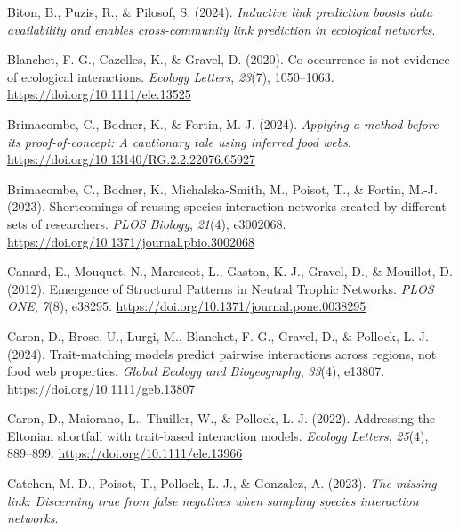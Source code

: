 \documentclass[
]{article}
\newlength{\cslhangindent}
\newenvironment{CSLReferences}[2] %
 {\begin{list}{}{%
  \setlength{\itemindent}{0pt}
  \setlength{\leftmargin}{0pt}
  \setlength{\parsep}{0pt}
  \ifodd #1
   \setlength{\leftmargin}{\cslhangindent}
   \setlength{\itemindent}{-1\cslhangindent}
  \fi
  \setlength{\itemsep}{#2\baselineskip}}}
 {\end{list}}
\begin{document}
\begin{CSLReferences}{1}{0}
Biton, B., Puzis, R., \& Pilosof, S. (2024). \emph{Inductive link
prediction boosts data availability and enables cross-community link
prediction in ecological networks}.

Blanchet, F. G., Cazelles, K., \& Gravel, D. (2020). Co-occurrence is
not evidence of ecological interactions. \emph{Ecology Letters},
\emph{23}(7), 1050--1063. \url{https://doi.org/10.1111/ele.13525}

Brimacombe, C., Bodner, K., \& Fortin, M.-J. (2024). \emph{Applying a
method before its proof-of-concept: {A} cautionary tale using inferred
food webs}. \url{https://doi.org/10.13140/RG.2.2.22076.65927}

Brimacombe, C., Bodner, K., Michalska-Smith, M., Poisot, T., \& Fortin,
M.-J. (2023). Shortcomings of reusing species interaction networks
created by different sets of researchers. \emph{PLOS Biology},
\emph{21}(4), e3002068.
\url{https://doi.org/10.1371/journal.pbio.3002068}

Canard, E., Mouquet, N., Marescot, L., Gaston, K. J., Gravel, D., \&
Mouillot, D. (2012). Emergence of {Structural Patterns} in {Neutral
Trophic Networks}. \emph{PLOS ONE}, \emph{7}(8), e38295.
\url{https://doi.org/10.1371/journal.pone.0038295}

Caron, D., Brose, U., Lurgi, M., Blanchet, F. G., Gravel, D., \&
Pollock, L. J. (2024). Trait-matching models predict pairwise
interactions across regions, not food web properties. \emph{Global
Ecology and Biogeography}, \emph{33}(4), e13807.
\url{https://doi.org/10.1111/geb.13807}

Caron, D., Maiorano, L., Thuiller, W., \& Pollock, L. J. (2022).
Addressing the {Eltonian} shortfall with trait-based interaction models.
\emph{Ecology Letters}, \emph{25}(4), 889--899.
\url{https://doi.org/10.1111/ele.13966}

Catchen, M. D., Poisot, T., Pollock, L. J., \& Gonzalez, A. (2023).
\emph{The missing link: Discerning true from false negatives when
sampling species interaction networks}.


\end{CSLReferences}
\end{document}
